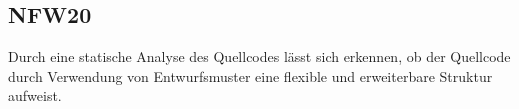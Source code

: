 \subsection*{NFW20}

Durch eine \gls{statische Analyse} des \Gls{Quellcode}s lässt sich erkennen, ob der \Gls{Quellcode} durch Verwendung von \Gls{Entwurfsmuster} eine flexible und erweiterbare Struktur aufweist.
